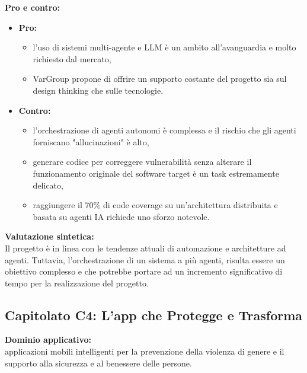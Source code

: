 \vspace{0.3cm}
\textbf{Pro e contro:}
\begin{itemize}
	\item \textbf{Pro:} 
        \begin{itemize}
            \item l'uso di sistemi multi-agente e LLM è un ambito all'avanguardia e molto richiesto dal mercato,
            \item VarGroup propone di offrire un supporto costante del progetto sia sul design thinking che sulle tecnologie.
        \end{itemize}
	\item \textbf{Contro:}
        \begin{itemize}
            \item l'orchestrazione di agenti autonomi è complessa e il rischio che gli agenti forniscano "allucinazioni" è alto,
            \item generare codice per correggere vulnerabilità senza alterare il funzionamento originale del software target è un task estremamente delicato,
            \item raggiungere il 70\% di code coverage su un'architettura distribuita e basata su agenti IA richiede uno sforzo notevole.
        \end{itemize}
\end{itemize}

\vspace{0.3cm}
\textbf{Valutazione sintetica:} \\
Il progetto è in linea con le tendenze attuali di automazione e architetture ad agenti. Tuttavia, l'orchestrazione di un sistema a più agenti, risulta essere un obiettivo complesso e che potrebbe portare ad un incremento significativo di tempo per la realizzazione del progetto.

\vspace{0.5cm}

\vspace{0.5cm}

\subsection{Capitolato C4: {L'app che Protegge e Trasforma} }

\textbf{Dominio applicativo:} \\
{applicazioni mobili intelligenti per la prevenzione della violenza di genere e il supporto alla sicurezza e al benessere delle persone.}


